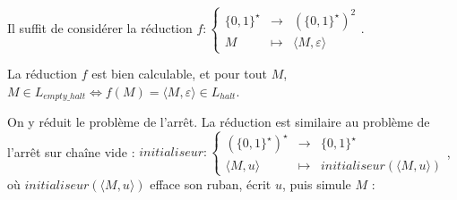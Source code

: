 \begin{corrections}
  \begin{questions}
  \item 
    Il suffit de considérer la réduction
    $f : \left\{\begin{array}{rcll}
    \{0,1\}^\star &\rightarrow& (\{0,1\}^\star)^2\\
    M & \mapsto& \langle M, \varepsilon \rangle
    \end{array}\right.$.

    La réduction $f$ est bien calculable, et pour tout $M$, 
    $M \in L_{\mathit{empty\_halt}} \Leftrightarrow f(M) = \langle M, \varepsilon \rangle \in L_{\mathit{halt}}$.
  \item 
    On y réduit le problème de l'arrêt. La réduction est similaire au problème de l'arrêt sur chaîne vide : 
    $\mathit{initialiseur} : \left\{\begin{array}{rcll}
    (\{0,1\}^\star)^\star &\rightarrow& \{0,1\}^\star\\
    \langle M, u \rangle & \mapsto&  \mathit{initialiseur}(\langle M, u \rangle)
    \end{array}\right.$, \\où $\mathit{initialiseur}(\langle M, u \rangle)$
    efface son ruban, écrit $u$, puis simule $M$ : 


  \end{questions}
  
\end{corrections}

\endgroup
\endinput
